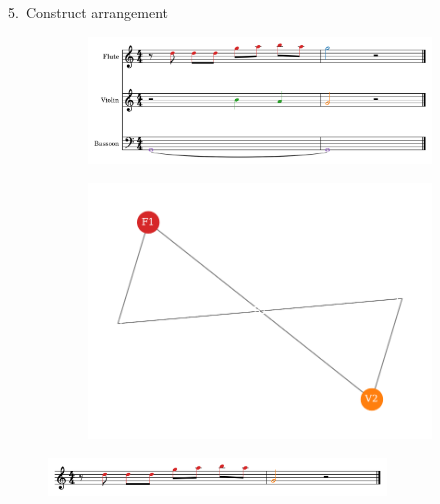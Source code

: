 \documentclass[handout]{beamer}
\begin{document}
\begin{frame}{5.\ Construct arrangement}
    \begin{figure}
        \begin{subfigure}{0.6\linewidth}
            \includegraphics[width=0.9\linewidth]{toy-1.png}
        \end{subfigure}\hfill
        \begin{subfigure}{0.4\linewidth}
            \includegraphics[width=0.9\linewidth]{toy_solution.pdf}
        \end{subfigure}
    \end{figure}
    \pause
    \centering
    \begin{figure}
        \includegraphics[width=0.8\textwidth]{toy_arrangement-1.png}
    \end{figure}

\end{frame}
\end{document}
